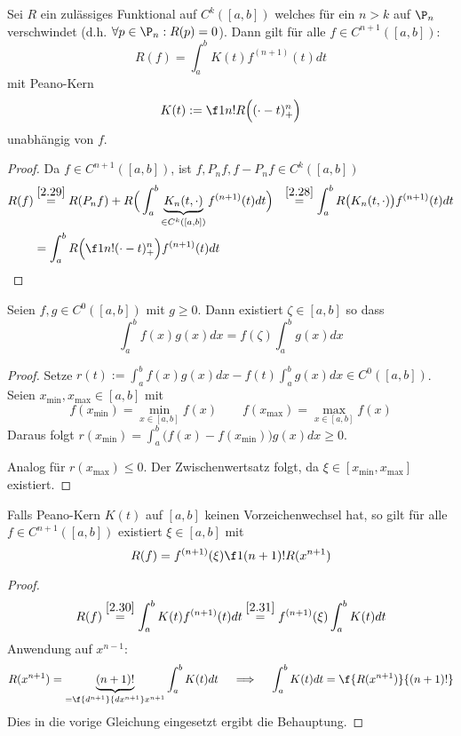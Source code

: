 \documentclass[11pt]{scrartcl}
\begin{document}
\begin{st}
	\label{2.30}
	Sei $R$ ein zulässiges Funktional auf $C^k([a,b])$ welches für ein $n>k$ auf $\P_n$ verschwindet (d.h. $\forall p\in \P_n : R(p)=0$).
	Dann gilt für alle $f\in C^{n+1}([a,b])$:
	\[
		R(f) = \int_a^b K(t) f^{(n+1)}(t) dt
	\]
	mit Peano-Kern 
	\[
		K(t) := \f 1{n!}R\Big((\cdot - t)^n_+\Big)
	\]
	unabhängig von $f$.
	\begin{proof}
		Da $f\in C^{n+1}([a,b])$, ist $f,P_nf,f-P_nf \in C^k([a,b])$
		\begin{align*}
			R(f) &\stackrel{\ref{2.29}}= R(P_n f) + R \Big( \int_a^b \underbrace{K_n(t,\cdot)}_{\in C^k([a,b])} f^{(n+1)}(t) dt \Big)
			&\stackrel{\ref{2.28}} =  \int_a^b R\big(K_n(t,\cdot)\big) f^{(n+1)}(t) dt \\
			&= \int_a^b R \Big( \f 1{n!}(\cdot - t)^n_+ \Big) f^{(n+1)}(t) dt
		\end{align*}
	\end{proof}
\end{st}

\begin{lem} \label{2.31}
	Seien $f,g \in C^0([a,b])$ mit $g\ge 0$.
	Dann existiert $\zeta \in [a,b]$ so dass
	\[
		\int_a^b f(x) g(x) dx = f(\zeta) \int_a^b g(x) dx
	\]
	\begin{proof}
		Setze $r(t) := \int_a^b f(x)g(x) dx - f(t) \int_a^b g(x) dx \in C^0([a,b])$.
		Seien $x_{\text{min}}, x_{\text{max}} \in [a,b]$ mit
		\[
			f(x_{\text{min}}) = \min_{x\in[a,b]} f(x)
			\qquad
			f(x_{\text{max}}) = \max_{x\in[a,b]} f(x)
		\]
		Daraus folgt $r(x_{\text{min}}) = \int_a^b \big(f(x)-f(x_{\text{min}})\big)g(x) dx \ge 0$.

		Analog für $r(x_{\text{max}}) \le 0$.
		Der Zwischenwertsatz folgt, da $\xi \in[x_{\text{min}}, x_{\text{max}}]$ existiert.
	\end{proof}
\end{lem}

\begin{kor} \label{2.32}
	Falls Peano-Kern $K(t)$ auf $[a,b]$ keinen Vorzeichenwechsel hat, so gilt für alle $f\in C^{n+1}([a,b])$ existiert $\xi\in [a,b]$ mit
	\[
		R(f) = f^{(n+1)}(\xi) \f 1{(n+1)!} R(x^{n+1})
	\]
	\begin{proof}
		\[
			R(f) \stackrel{\ref{2.30}}= \int_a^b K(t) f^{(n+1)}(t) dt 
			\stackrel{\ref{2.31}}= f^{(n+1)}(\xi)\int_a^b K(t) dt
		\]
		Anwendung auf $x^{n-1}$:
		\[
			R(x^{n+1}) = \underbrace{(n+1)!}_{=\f {d^{n+1}}{dx^{n+1}}x^{n+1}} \int_a^b K(t) dt \quad 
			\implies \quad \int_a^b K(t) dt = \f {R(x^{n+1})}{(n+1)!}
		\]
		Dies in die vorige Gleichung eingesetzt ergibt die Behauptung.
	\end{proof}
\end{kor}
\end{document}
